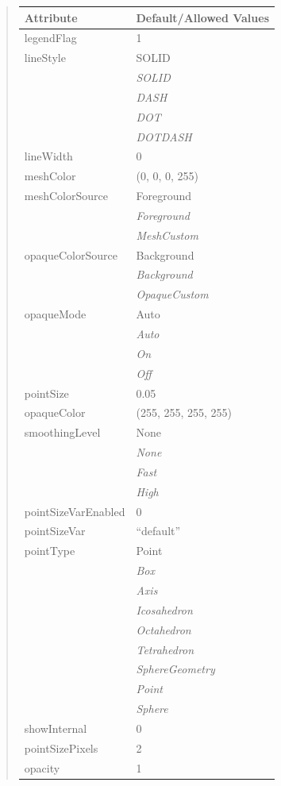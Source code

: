\documentclass[letterpaper,10pt,english]{sphinxmanual}
\begin{document}
\begin{quote}
\begin{longtable}{|l|l|}
\textbf{Attribute}
 & 
\textbf{Default/Allowed Values}
\\
\hline
legendFlag
 & 
1
\\
\hline
lineStyle
 & 
SOLID
\\
\hline & 
\emph{SOLID}
\\
\hline & 
\emph{DASH}
\\
\hline & 
\emph{DOT}
\\
\hline & 
\emph{DOTDASH}
\\
\hline
lineWidth
 & 
0
\\
\hline
meshColor
 & 
(0, 0, 0, 255)
\\
\hline
meshColorSource
 & 
Foreground
\\
\hline & 
\emph{Foreground}
\\
\hline & 
\emph{MeshCustom}
\\
\hline
opaqueColorSource
 & 
Background
\\
\hline & 
\emph{Background}
\\
\hline & 
\emph{OpaqueCustom}
\\
\hline
opaqueMode
 & 
Auto
\\
\hline & 
\emph{Auto}
\\
\hline & 
\emph{On}
\\
\hline & 
\emph{Off}
\\
\hline
pointSize
 & 
0.05
\\
\hline
opaqueColor
 & 
(255, 255, 255, 255)
\\
\hline
smoothingLevel
 & 
None
\\
\hline & 
\emph{None}
\\
\hline & 
\emph{Fast}
\\
\hline & 
\emph{High}
\\
\hline
pointSizeVarEnabled
 & 
0
\\
\hline
pointSizeVar
 & 
``default''
\\
\hline
pointType
 & 
Point
\\
\hline & 
\emph{Box}
\\
\hline & 
\emph{Axis}
\\
\hline & 
\emph{Icosahedron}
\\
\hline & 
\emph{Octahedron}
\\
\hline & 
\emph{Tetrahedron}
\\
\hline & 
\emph{SphereGeometry}
\\
\hline & 
\emph{Point}
\\
\hline & 
\emph{Sphere}
\\
\hline
showInternal
 & 
0
\\
\hline
pointSizePixels
 & 
2
\\
\hline
opacity
 & 
1
\\
\hline\end{longtable}

\end{quote}
\end{document}
